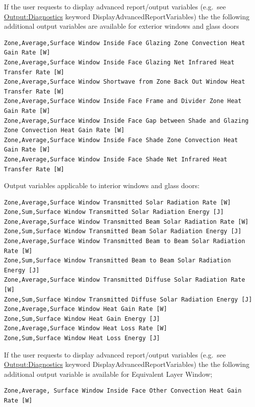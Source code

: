 If the user requests to display advanced report/output variables (e.g.~see \hyperref[outputdiagnostics]{Output:Diagnostics} keyword DisplayAdvancedReportVariables) the the following additional output variables are available for exterior windows and glass doors

\begin{lstlisting}
Zone,Average,Surface Window Inside Face Glazing Zone Convection Heat Gain Rate [W]
Zone,Average,Surface Window Inside Face Glazing Net Infrared Heat Transfer Rate [W]
Zone,Average,Surface Window Shortwave from Zone Back Out Window Heat Transfer Rate [W]
Zone,Average,Surface Window Inside Face Frame and Divider Zone Heat Gain Rate [W]
Zone,Average,Surface Window Inside Face Gap between Shade and Glazing Zone Convection Heat Gain Rate [W]
Zone,Average,Surface Window Inside Face Shade Zone Convection Heat Gain Rate [W]
Zone,Average,Surface Window Inside Face Shade Net Infrared Heat Transfer Rate [W]
\end{lstlisting}

Output variables applicable to interior windows and glass doors:

\begin{lstlisting}
Zone,Average,Surface Window Transmitted Solar Radiation Rate [W]
Zone,Sum,Surface Window Transmitted Solar Radiation Energy [J]
Zone,Average,Surface Window Transmitted Beam Solar Radiation Rate [W]
Zone,Sum,Surface Window Transmitted Beam Solar Radiation Energy [J]
Zone,Average,Surface Window Transmitted Beam to Beam Solar Radiation Rate [W]
Zone,Sum,Surface Window Transmitted Beam to Beam Solar Radiation Energy [J]
Zone,Average,Surface Window Transmitted Diffuse Solar Radiation Rate [W]
Zone,Sum,Surface Window Transmitted Diffuse Solar Radiation Energy [J]
Zone,Average,Surface Window Heat Gain Rate [W]
Zone,Sum,Surface Window Heat Gain Energy [J]
Zone,Average,Surface Window Heat Loss Rate [W]
Zone,Sum,Surface Window Heat Loss Energy [J]
\end{lstlisting}

If the user requests to display advanced report/output variables (e.g.~see \hyperref[outputdiagnostics]{Output:Diagnostics} keyword DisplayAdvancedReportVariables) the the following additional output variable is available for Equivalent Layer Window;

\begin{lstlisting}
Zone,Average, Surface Window Inside Face Other Convection Heat Gain Rate [W]
\end{lstlisting}

